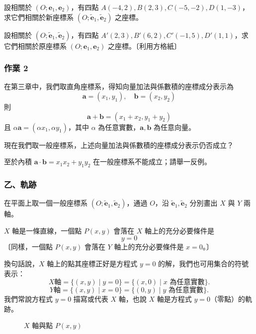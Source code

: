 設相關於 $(O; \mathbf{e}_1, \mathbf{e}_2)$，有四點 $A(-4, 2), B(2, 3), C(-5, -2), D(1, -3)$，求它們相關於新座標系 $(O; \tilde{\mathbf{e}}_1, \tilde{\mathbf{e}}_2)$ 之座標。

設相關於 $(O; \tilde{\mathbf{e}}_1, \tilde{\mathbf{e}}_2)$，有四點 $A'(2, 3), B'(6, 2), C'(-1, 5), D'(1, 1)$，求它們相關於原座標系 $(O; \mathbf{e}_1, \mathbf{e}_2)$ 之座標。〔利用方格紙〕

\subsubsection*{作業 2}
在第三章中，我們取直角座標系，得知向量加法與係數積的座標成分表示為
\[ \mathbf{a} = (x_1, y_1), \quad \mathbf{b} = (x_2, y_2) \]
則
\[ \mathbf{a} + \mathbf{b} = (x_1 + x_2, y_1 + y_2) \]
且 $\alpha\mathbf{a} = (\alpha x_1, \alpha y_1)$，其中 $\alpha$ 為任意實數，$\mathbf{a}, \mathbf{b}$ 為任意向量。

現在我們取一般座標系，上述向量加法與係數積的座標成分表示仍否成立？

至於內積 $\mathbf{a}\cdot\mathbf{b} = x_1 x_2 + y_1 y_2$ 在一般座標系不能成立；請舉一反例。

\subsubsection*{乙、軌跡}

在平面上取一個一般座標系 $(O; \tilde{\mathbf{e}}_1, \tilde{\mathbf{e}}_2)$，通過 $O$，沿 $\tilde{\mathbf{e}}_1, \tilde{\mathbf{e}}_2$ 分別畫出 $X$ 與 $Y$ 兩軸。

$X$ 軸是一條直線，一個點 $P(x, y)$ 會落在 $X$ 軸上的充分必要條件是
\[ y = 0 \]
〔同樣，一個點 $P(x, y)$ 會落在 $Y$ 軸上的充分必要條件是 $x = 0$。〕

換句話說，$X$ 軸上的點其座標正好是方程式 $y = 0$ 的解，我們也可用集合的符號表示：
\[ X\text{軸} = \{(x, y) \mid y = 0\} = \{(x, 0) \mid x \text{ 為任意實數}\}. \]
\[ Y\text{軸} = \{(x, y) \mid x = 0\} = \{(0, y) \mid y \text{ 為任意實數}\}. \]
我們常說方程式 $y = 0$ 描寫或代表 $X$ 軸，也說 $X$ 軸是方程式 $y = 0$（零點）的軌跡。

\begin{figure}[H]
\centering
{}
\caption{$X$ 軸與點 $P(x,y)$}
\label{fig:4-3}
\end{figure}


